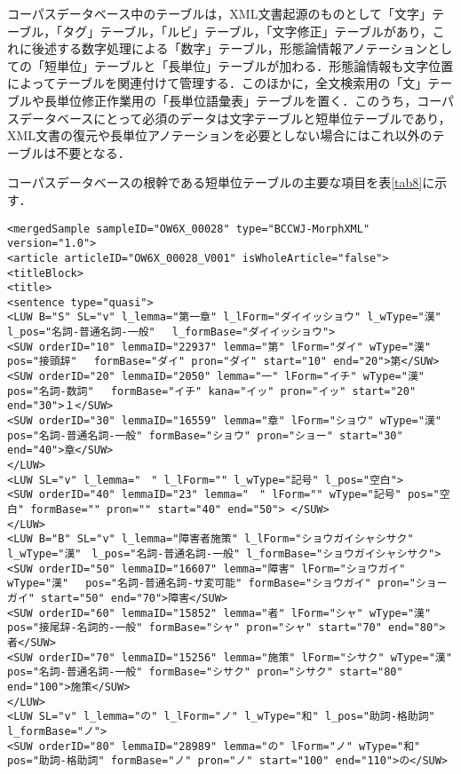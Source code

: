 \documentclass[japanese]{jnlp_1.4}
\begin{document}
コーパスデータベース中のテーブルは，XML文書起源のものとして「文字」テーブル，「タグ」テーブル，「ルビ」テーブル，「文字修正」テーブルがあり，これに後述する数字処理による「数字」テーブル，形態論情報アノテーションとしての「短単位」テーブルと「長単位」テーブルが加わる．形態論情報も文字位置によってテーブルを関連付けて管理する．このほかに，全文検索用の「文」テーブルや長単位修正作業用の「長単位語彙表」テーブルを置く．このうち，コーパスデータベースにとって必須のデータは文字テーブルと短単位テーブルであり，XML文書の復元や長単位アノテーションを必要としない場合にはこれ以外のテーブルは不要となる．

コーパスデータベースの根幹である短単位テーブルの主要な項目を表\ref{tab8}に示す．

    \begin{lstlisting}[title=\textbf{リスト1}　短単位と長単位のアノテーション例（X-XML）]
<mergedSample sampleID="OW6X_00028" type="BCCWJ-MorphXML" version="1.0">
<article articleID="OW6X_00028_V001" isWholeArticle="false">
<titleBlock>
<title>
<sentence type="quasi">
<LUW B="S" SL="v" l_lemma="第一章" l_lForm="ダイイッショウ" l_wType="漢" l_pos="名詞-普通名詞-一般"　 l_formBase="ダイイッショウ">
<SUW orderID="10" lemmaID="22937" lemma="第" lForm="ダイ" wType="漢" pos="接頭辞"　 formBase="ダイ" pron="ダイ" start="10" end="20">第</SUW>
<SUW orderID="20" lemmaID="2050" lemma="一" lForm="イチ" wType="漢" pos="名詞-数詞"　 formBase="イチ" kana="イッ" pron="イッ" start="20" end="30">１</SUW>
<SUW orderID="30" lemmaID="16559" lemma="章" lForm="ショウ" wType="漢"　pos="名詞-普通名詞-一般" formBase="ショウ" pron="ショー" start="30" end="40">章</SUW>
</LUW>
<LUW SL="v" l_lemma="　" l_lForm="" l_wType="記号" l_pos="空白">
<SUW orderID="40" lemmaID="23" lemma="　" lForm="" wType="記号" pos="空白" formBase="" pron="" start="40" end="50"> </SUW>
</LUW>
<LUW B="B" SL="v" l_lemma="障害者施策" l_lForm="ショウガイシャシサク" l_wType="漢"　l_pos="名詞-普通名詞-一般" l_formBase="ショウガイシャシサク">
<SUW orderID="50" lemmaID="16607" lemma="障害" lForm="ショウガイ" wType="漢"　 pos="名詞-普通名詞-サ変可能" formBase="ショウガイ" pron="ショーガイ" start="50" end="70">障害</SUW>
<SUW orderID="60" lemmaID="15852" lemma="者" lForm="シャ" wType="漢"　pos="接尾辞-名詞的-一般" formBase="シャ" pron="シャ" start="70" end="80">者</SUW>
<SUW orderID="70" lemmaID="15256" lemma="施策" lForm="シサク" wType="漢"　pos="名詞-普通名詞-一般" formBase="シサク" pron="シサク" start="80" end="100">施策</SUW>
</LUW>
<LUW SL="v" l_lemma="の" l_lForm="ノ" l_wType="和" l_pos="助詞-格助詞" l_formBase="ノ">
<SUW orderID="80" lemmaID="28989" lemma="の" lForm="ノ" wType="和" pos="助詞-格助詞" formBase="ノ" pron="ノ" start="100" end="110">の</SUW>

\end{lstlisting}
\end{document}
